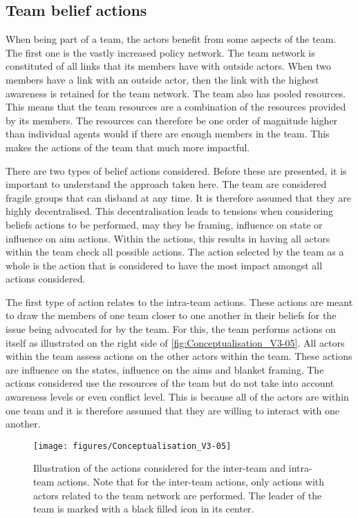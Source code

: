 \subsection{Team belief actions}

When being part of a team, the actors benefit from some aspects of the team. The first one is the vastly increased policy network. The team network is constituted of all links that its members have with outside actors. When two members have a link with an outside actor, then the link with the highest awareness is retained for the team network. The team also has pooled resources. This means that the team resources are a combination of the resources provided by its members. The resources can therefore be one order of magnitude higher than individual agents would if there are enough members in the team. This makes the actions of the team that much more impactful.

There are two types of belief actions considered. Before these are presented, it is important to understand the approach taken here. The team are considered fragile groups that can disband at any time. It is therefore assumed that they are highly decentralised. This decentralisation leads to tensions when considering beliefs actions to be performed, may they be framing, influence on state or influence on aim actions. Within the actions, this results in having all actors within the team check all possible actions. The action selected by the team as a whole is the action that is considered to have the most impact amongst all actions considered.

The first type of action relates to the intra-team actions. These actions are meant to draw the members of one team closer to one another in their beliefs for the issue being advocated for by the team. For this, the team performs actions on itself as illustrated on the right side of \autoref{fig:Conceptualisation_V3-05}. All actors within the team assess actions on the other actors within the team. These actions are influence on the states, influence on the aims and blanket framing. The actions considered use the resources of the team but do not take into account awareness levels or even conflict level. This is because all of the actors are within one team and it is therefore assumed that they are willing to interact with one another.

\begin{figure}
\centering
\texttt{[image: figures/Conceptualisation\_V3-05]}
\caption{Illustration of the actions considered for the inter-team and intra-team actions. Note that for the inter-team actions, only actions with actors related to the team network are performed. The leader of the team is marked with a black filled icon in its center.}
\label{fig:Conceptualisation_V3-05}
\end{figure}

